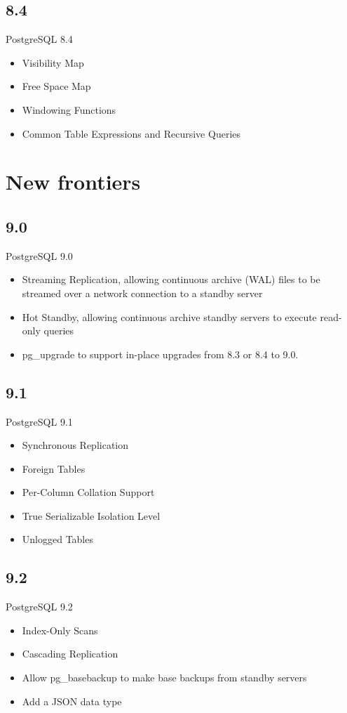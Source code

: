 \documentclass[t,10pt]{beamer}
\begin{document}
\subsection{8.4}
\begin{frame}{PostgreSQL 8.4}
  \begin{itemize}%
  \item Visibility Map
  \item Free Space Map
  \item Windowing Functions
  \item Common Table Expressions and Recursive Queries
  \end{itemize}
\end{frame}

\section{New frontiers}
\subsection{9.0}
\begin{frame}{PostgreSQL 9.0}
  \begin{itemize}%
  \item Streaming Replication, allowing continuous archive (WAL) files to be streamed over a network connection to a standby server
  \item Hot Standby, allowing continuous archive standby servers to execute read-only queries
  \item pg\_upgrade to support in-place upgrades from 8.3 or 8.4 to 9.0.
  \end{itemize}
\end{frame}
\subsection{9.1}
\begin{frame}{PostgreSQL 9.1}
  \begin{itemize}%
  \item Synchronous Replication
  \item Foreign Tables
  \item Per-Column Collation Support
  \item True Serializable Isolation Level
  \item Unlogged Tables
  \end{itemize}
\end{frame}
\subsection{9.2}
\begin{frame}{PostgreSQL 9.2}
  \begin{itemize}%
  \item Index-Only Scans
  \item Cascading Replication
  \item Allow pg\_basebackup to make base backups from standby servers
  \item Add a JSON data type
  \end{itemize}
\end{frame}
\end{document}

